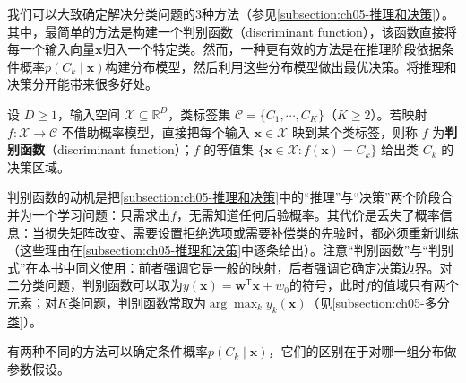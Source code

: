 \documentclass[../main.tex]{subfiles}
\begin{document}
我们可以大致确定解决分类问题的3种方法（参见\cref{subsection:ch05-推理和决策}）。其中，最简单的方法是构建一个判别函数（discriminant function），该函数直接将每一个输入向量$\boldsymbol{x}$归入一个特定类。然而，一种更有效的方法是在推理阶段依据条件概率$p(C_k\mid\boldsymbol{x})$构建分布模型，然后利用这些分布模型做出最优决策。将推理和决策分开能带来很多好处。

\begin{definition}[判别函数]\label{definition:ch05-判别函数}
设 $D\geqslant1$，输入空间 $\mathcal{X}\subseteq\mathbb{R}^{D}$，类标签集 $\mathcal{C}=\{C_1,\cdots,C_K\}$（$K\geqslant2$）。若映射 $f:\mathcal{X}\to\mathcal{C}$ 不借助概率模型，直接把每个输入 $\boldsymbol{x}\in\mathcal{X}$ 映到某个类标签，则称 $f$ 为\textbf{判别函数}（discriminant function）；$f$ 的等值集 $\{\boldsymbol{x}\in\mathcal{X}:f(\boldsymbol{x})=C_k\}$ 给出类 $C_k$ 的决策区域。
\end{definition}

\begin{remark}
判别函数的动机是把\cref{subsection:ch05-推理和决策}中的“推理”与“决策”两个阶段合并为一个学习问题：只需求出$f$，无需知道任何后验概率。其代价是丢失了概率信息：当损失矩阵改变、需要设置拒绝选项或需要补偿类的先验时，都必须重新训练（这些理由在\cref{subsection:ch05-推理和决策}中逐条给出）。注意“判别函数”与“判别式”在本书中同义使用：前者强调它是一般的映射，后者强调它确定决策边界。对二分类问题，判别函数可以取为$y(\boldsymbol{x})=\boldsymbol{w}^{\mathsf{T}}\boldsymbol{x}+w_0$的符号，此时$f$的值域只有两个元素；对$K$类问题，判别函数常取为$\arg\max_k y_k(\boldsymbol{x})$（见\cref{subsection:ch05-多分类}）。
\end{remark}

有两种不同的方法可以确定条件概率$p(C_k\mid\boldsymbol{x})$，它们的区别在于对哪一组分布做参数假设。
\end{document}
